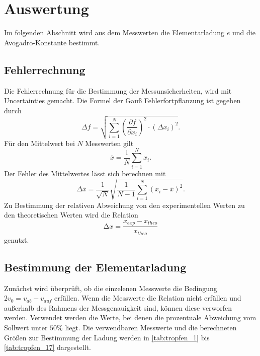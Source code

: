 \section{Auswertung}
\label{sec:auswertung}

Im folgenden Abschnitt wird aus dem Messwerten die Elementarladung $e$ und die Avogadro-Konstante bestimmt.
\subsection{Fehlerrechnung}
\label{sec:Fehlerrechnung}
Die Fehlerrechnung für die Bestimmung der Messunsicherheiten, wird mit Uncertainties \cite{uncertainties} gemacht.
Die Formel der Gauß Fehlerfortpflanzung ist gegeben durch
\begin{equation}
    \Delta f=\sqrt{\sum_{i=1}^N\left(\frac{\partial f}{\partial x_i}\right)^2 \cdot\left(\Delta x_i\right)^2}.
    \label{eqn:gauss}
\end{equation}
Für den Mittelwert bei $N$ Messwerten gilt 
\begin{equation}
    \bar{x} = \frac{1}{N}\sum\limits_{i = 1}^N x_i .
    \label{eqn:mittelwert}
\end{equation}
Der Fehler des Mittelwertes lässt sich berechnen mit
\begin{equation}
    \Delta \bar{x}=\frac{1}{\sqrt{N}} \sqrt{\frac{1}{N-1} \sum_{i=1}^N\left(x_i-\bar{x}\right)^2}.
    \label{eqn:mittelwertfehler}
\end{equation}
Zu Bestimmung der relativen Abweichung von den experimentellen Werten zu den theoretischen Werten wird die
Relation 
\begin{equation}
    \increment x = \frac{x_{exp}-x_{theo}}{x_{theo}}
\end{equation} 
genutzt.

\subsection{Bestimmung der Elementarladung}
\label{sec:bestimmung der elementarladung}

Zunächst wird überprüft, ob die einzelenen Messwerte die Bedingung $2v_0 = v_{ab}-v_{auf}$ erfüllen.
Wenn die Messwerte die Relation nicht erfüllen und außerhalb des Rahmens der Messgenauigkeit sind, können 
diese verworfen werden. Verwendet werden die Werte, bei denen die prozentuale Abweichung vom Sollwert unter
$50 \%$ liegt. Die verwendbaren Messwerte und die berechneten Größen zur Bestimmung der Ladung werden in \autoref{tab:tropfen_1} bis \autoref{tab:tropfen_17} dargestellt.

